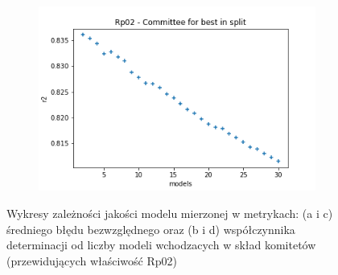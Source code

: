 \begin{figure}
\begin{subfigure}[b]{0.49\textwidth}
         \caption{}
         \label{fig:ea-split-mae-rp02}
     \end{subfigure}
     \begin{subfigure}[b]{0.49\textwidth}
         \centering
         \includegraphics[width=\textwidth]{images/Rp02_split_r2.png}
         \caption{}
         \label{fig:ea-split-r2-rp02}
     \end{subfigure}
        \caption{Wykresy zależności jakości modelu mierzonej w metrykach: (a i c) średniego błędu bezwzględnego oraz (b i d) współczynnika determinacji od liczby modeli wchodzacych w skład komitetów (przewidujących właściwość Rp02)}
        \label{fig:rp02-committee}
\end{figure}

